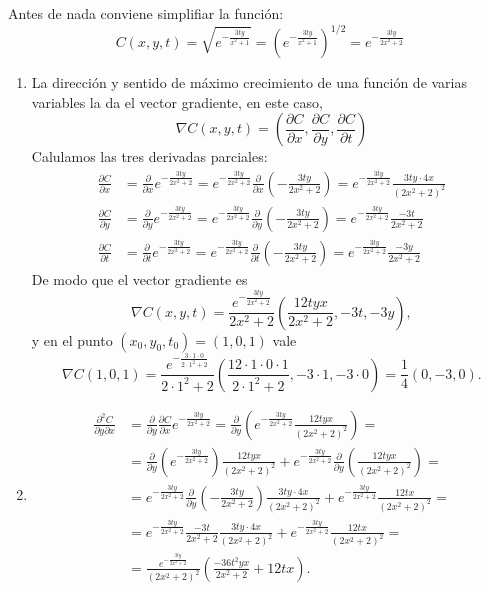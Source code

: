 {Antes de nada conviene simplifiar la función:
\[
C(x,y,t) = \sqrt{e^{-\frac{3ty}{x^2+1}}} = \left(e^{-\frac{3ty}{x^2+1}}\right)^{1/2} = e^{-\frac{3ty}{2x^2+2}}
\]
\begin{enumerate}
\item La dirección y sentido de máximo crecimiento de una función de varias variables la da el vector gradiente, en este caso,
\[
\nabla C(x,y,t) =\left(\frac{\partial C}{\partial x}, \frac{\partial C}{\partial y}, \frac{\partial C}{\partial t} \right)
\]
Calulamos las tres derivadas parciales:
\begin{align*}
\frac{\partial C}{\partial x} &= \frac{\partial}{\partial x} e^{-\frac{3ty}{2x^2+2}} = e^{-\frac{3ty}{2x^2+2}} \frac{\partial}{\partial x}\left(-\frac{3ty}{2x^2+2}\right) = e^{-\frac{3ty}{2x^2+2}}\frac{3ty\cdot 4x}{(2x^2+2)^2} \\
\frac{\partial C}{\partial y} &= \frac{\partial}{\partial y} e^{-\frac{3ty}{2x^2+2}} = e^{-\frac{3ty}{2x^2+2}} \frac{\partial}{\partial y}\left(-\frac{3ty}{2x^2+2}\right) = e^{-\frac{3ty}{2x^2+2}}\frac{-3t}{2x^2+2} \\
\frac{\partial C}{\partial t} &= \frac{\partial}{\partial t} e^{-\frac{3ty}{2x^2+2}} = e^{-\frac{3ty}{2x^2+2}} \frac{\partial}{\partial t}\left(-\frac{3ty}{2x^2+2}\right) = e^{-\frac{3ty}{2x^2+2}}\frac{-3y}{2x^2+2}
\end{align*}
De modo que el vector gradiente es
\[
\nabla C(x,y,t) =\frac{e^{-\frac{3ty}{2x^2+2}}}{2x^2+2}\left(\frac{12tyx}{2x^2+2}, -3t, -3y\right),
\] 
y en el punto $(x_0,y_0,t_0)=(1,0,1)$ vale
\[
\nabla C(1,0,1) =\frac{e^{-\frac{3\cdot 1\cdot 0}{2\cdot 1^2+2}}}{2\cdot 1^2+2}\left(\frac{12\cdot 1\cdot 0\cdot 1}{2\cdot 1^2+2}, -3\cdot 1, -3\cdot 0\right) = \frac{1}{4}(0,-3,0).
\] 

\item
\begin{align*}
\frac{\partial^2 C}{\partial y\partial x} &= \frac{\partial}{\partial y}\frac{\partial C}{\partial x} e^{-\frac{3ty}{2x^2+2}} = \frac{\partial}{\partial y}  \left(e^{-\frac{3ty}{2x^2+2}}\frac{12tyx}{(2x^2+2)^2}\right) = \\
&= \frac{\partial}{\partial y} \left(e^{-\frac{3ty}{2x^2+2}}\right)\frac{12tyx}{(2x^2+2)^2}+e^{-\frac{3ty}{2x^2+2}}\frac{\partial}{\partial y}\left(\frac{12tyx}{(2x^2+2)^2}\right) = \\
&= e^{-\frac{3ty}{2x^2+2}}\frac{\partial}{\partial y}\left(-\frac{3ty}{2x^2+2}\right)\frac{3ty\cdot 4x}{(2x^2+2)^2}+e^{-\frac{3ty}{2x^2+2}}\frac{12tx}{(2x^2+2)^2} = \\
&= e^{-\frac{3ty}{2x^2+2}}\frac{-3t}{2x^2+2}\frac{3ty\cdot 4x}{(2x^2+2)^2}+e^{-\frac{3ty}{2x^2+2}}\frac{12tx}{(2x^2+2)^2} = \\
&= \frac{e^{-\frac{3ty}{2x^2+2}}}{(2x^2+2)^2}\left(\frac{-36t^2yx}{2x^2+2}+12tx\right).
\end{align*}


\end{enumerate}}
